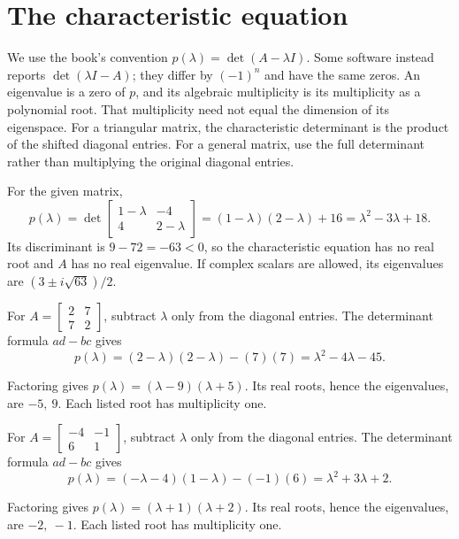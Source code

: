 \section{The characteristic equation}
We use the book's convention $p(\lambda)=\det(A-\lambda I)$.
Some software instead reports $\det(\lambda I-A)$; they differ
by $(-1)^n$ and have the same zeros. An eigenvalue is a zero of
$p$, and its algebraic multiplicity is its multiplicity as a polynomial
root. That multiplicity need not equal the dimension of its eigenspace.
For a triangular matrix, the characteristic determinant is the product
of the shifted diagonal entries. For a general matrix, use the full
determinant rather than multiplying the original diagonal entries.

For the given matrix,
\[
 p(\lambda)=\det\begin{bmatrix}1-\lambda&-4\\4&2-\lambda\end{bmatrix}
 =(1-\lambda)(2-\lambda)+16=\lambda^2-3\lambda+18.
\]
Its discriminant is $9-72=-63<0$, so the characteristic equation
has no real root and $A$ has no real eigenvalue. If complex scalars
are allowed, its eigenvalues are $(3\pm i\sqrt{63})/2$.

For $A=\begin{bmatrix}2 & 7\\7 & 2\end{bmatrix}$, subtract $\lambda$ only from the diagonal entries. The determinant formula $ad-bc$ gives
\[ p(\lambda)=(2 - \lambda)(2 - \lambda)-(7)(7)=\lambda^{2} - 4 \lambda - 45.\]

Factoring gives $p(\lambda)=\left(\lambda - 9\right) \left(\lambda + 5\right)$. Its real roots, hence the eigenvalues, are $-5,\ 9$. Each listed root has multiplicity one.

For $A=\begin{bmatrix}-4 & -1\\6 & 1\end{bmatrix}$, subtract $\lambda$ only from the diagonal entries. The determinant formula $ad-bc$ gives
\[ p(\lambda)=(- \lambda - 4)(1 - \lambda)-(-1)(6)=\lambda^{2} + 3 \lambda + 2.\]

Factoring gives $p(\lambda)=\left(\lambda + 1\right) \left(\lambda + 2\right)$. Its real roots, hence the eigenvalues, are $-2,\ -1$. Each listed root has multiplicity one.

